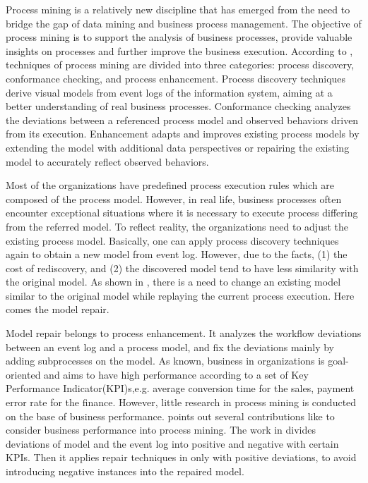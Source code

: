 %
Process mining is a relatively new discipline that has emerged from the need to bridge the gap of data mining and business process management. The objective of process mining is to support the analysis of business processes, provide valuable insights on processes and further improve the business execution. According to \cite{van2011process}, techniques of process mining are divided into three categories: process discovery, conformance checking, and process enhancement. Process discovery techniques derive visual models from event logs of the information system, aiming at a better understanding of real business processes. Conformance checking analyzes the deviations between a referenced process model and observed behaviors driven from its execution. Enhancement adapts and improves existing process models by extending the model with additional data perspectives or repairing the existing model to accurately reflect observed behaviors. 

Most of the organizations have predefined process execution rules which are composed of the process model. However, in real life, business processes often encounter exceptional situations where it is necessary to execute process differing from the referred model. To reflect reality, the organizations need to adjust the existing process model. Basically, one can apply process discovery techniques again to obtain a new model from event log. However, due to the facts, (1) the cost of rediscovery, and (2)  the discovered model tend to have less similarity with the original model\cite{fahland2012repairing}. As shown in \cite{fahland2012repairing}, there is a need to change an existing model similar to the original model while replaying the current process execution. Here comes the model repair. 

Model repair belongs to process enhancement\cite{fahland2012repairing}. It analyzes the workflow deviations between an event log and a process model, and fix the deviations mainly by adding subprocesses on the model. As known, business in organizations is goal-oriented and aims to have high performance according to a set of Key Performance Indicator(KPI)s,e.g. average conversion time for the sales, payment error rate for the finance.  However, little research in process mining is conducted on the base of business performance\cite{ghasemi2019event}.  \cite{ghasemi2019event} points out several contributions like \cite{dees2017enhancing} to consider business performance into process mining. The work in \cite{dees2017enhancing} divides deviations of model and the event log into positive and negative with certain KPIs. Then it applies repair techniques in \cite{fahland2015model} only with positive deviations, to avoid introducing negative instances into the repaired model. 

